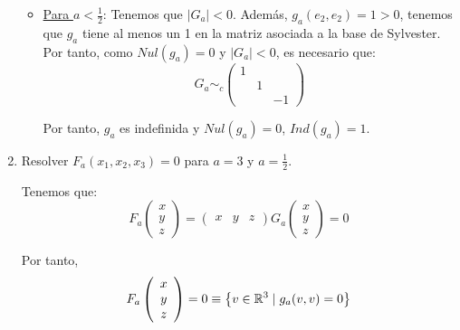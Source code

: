 \begin{ejercicio}
\begin{enumerate}
\begin{itemize}
            \item \underline{Para $a <\frac{1}{2}$}: Tenemos que $|G_a|<0$. Además, $g_a(e_2, e_2)=1>0$, tenemos que $g_a$ tiene al menos un 1 en la matriz asociada a la base de Sylvester. Por tanto, como $Nul(g_a)=0$ y $|G_a|<0$, es necesario que:
            \begin{equation*}
                G_a\sim_c \left(\begin{array}{ccc}
                    1 &  \\
                     & 1 &  \\
                    &  & -1
                \end{array}\right)
            \end{equation*}

            Por tanto, $g_a$ es indefinida y $Nul(g_a)=0$, $Ind(g_a)=1$.
        \end{itemize}

        \item Resolver $F_a(x_1, x_2, x_3) = 0$ para $a = 3$ y $a = \frac{1}{2}$.


        Tenemos que:
        \begin{equation*}
            F_a\left(\begin{array}{c}
                        x \\ y \\ z
                    \end{array}\right)
            =\left(\begin{array}{cccc}
                        x & y & z
                    \end{array}\right) 
            G_a
            \left(\begin{array}{c}
                        x \\ y \\ z
                    \end{array}\right) = 0
        \end{equation*}

        Por tanto,
        \begin{equation*}
            F_a\left(\begin{array}{c}
                        x \\ y \\ z
                    \end{array}\right)
            = 0 \equiv \left\{v\in \mathbb{R}^3 \mid g_a(v,v)=0\right\}
        \end{equation*}


\end{enumerate}
\end{ejercicio}
